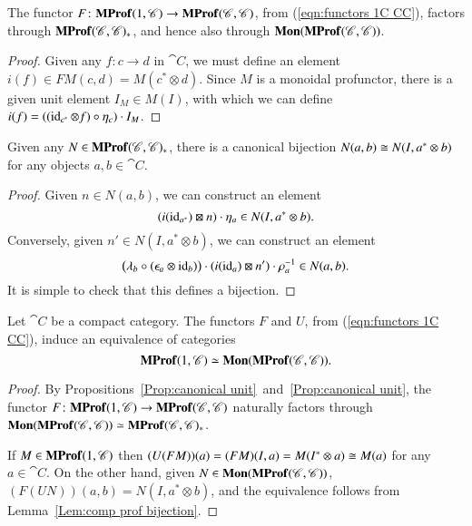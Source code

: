 \documentclass[12pt,oneside,article,draft]{memoir}
\begin{document}
\begin{proposition}\label{Prop:canonical unit}
	The functor $F\colon\mathbf{MProf}(1,\mathscr{C})\to\mathbf{MProf}(\mathscr{C},\mathscr{C})$, from (\ref{eqn:functors 1C CC}), factors through $\mathbf{MProf}(\mathscr{C},\mathscr{C})_*$, and hence also through $\mathbf{Mon}(\mathbf{MProf}(\mathscr{C},\mathscr{C}))$.
\end{proposition}
\begin{proof}
	Given any $f\colon c\to d$ in $\cat{C}$, we must define an element $i(f)\in FM(c,d)=M(c^*\otimes d)$. Since $M$ is a monoidal profunctor, there is a given unit element $I_M\in M(I)$, with which we can define $i(f)=((\operatorname{id}_{c^*}\otimes f)\circ\eta_c)\cdot I_M$.
\end{proof}

\begin{lemma}\label{Lem:comp prof bijection}
  Given any $N\in\mathbf{MProf}(\mathscr{C},\mathscr{C})_*$, there is a canonical bijection $N(a,b)\cong N(I,a^*\otimes b)$ for any objects $a,b\in\cat{C}$.
\end{lemma}
\begin{proof}
  Given $n\in N(a,b)$, we can construct an element
  \[
    (i(\operatorname{id}_{a^*})\boxtimes n)\cdot\eta_a \in N(I,a^*\otimes b).
  \]
  Conversely, given $n'\in N(I,a^*\otimes b)$, we can construct an element 
  \[
    \bigl(\lambda_b\circ(\epsilon_a\otimes\operatorname{id}_b)\bigr)\cdot(i(\operatorname{id}_a)\boxtimes n')\cdot\rho_a^{-1} \in N(a,b).
  \]
  It is simple to check that this defines a bijection.
\end{proof}

\begin{proposition}\label{Prop:mon prof equivalence}
	Let $\cat{C}$ be a compact category. The functors $F$ and $U$, from (\ref{eqn:functors 1C CC}), induce an equivalence of categories 
  \[
    \mathbf{MProf}(1,\mathscr{C})\simeq\mathbf{Mon}(\mathbf{MProf}(\mathscr{C},\mathscr{C})).
  \]
\end{proposition}
\begin{proof}
  By Propositions~\ref{Prop:canonical unit}~and~\ref{Prop:canonical unit}, the functor $F\colon\mathbf{MProf}(1,\mathscr{C}) \to \mathbf{MProf}(\mathscr{C},\mathscr{C})$ naturally factors through $\mathbf{Mon}(\mathbf{MProf}(\mathscr{C},\mathscr{C}))\simeq\mathbf{MProf}(\mathscr{C},\mathscr{C})_*$. 
  
  If $M\in\mathbf{MProf}(1,\mathscr{C})$ then $(U(FM))(a)=(FM)(I,a)=M(I^*\otimes a)\cong M(a)$ for any $a\in\cat{C}$. On the other hand, given $N\in\mathbf{Mon}(\mathbf{MProf}(\mathscr{C},\mathscr{C}))$, $(F(UN))(a,b)=N(I,a^*\otimes b)$, and the equivalence follows from Lemma~\ref{Lem:comp prof bijection}.
\end{proof}
\end{document}
